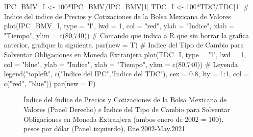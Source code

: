 \documentclass[
  a4paper,
]{article}
\newenvironment{Shaded}{}{}
\newcommand{\AttributeTok}[1]{\textcolor[rgb]{0.84,0.23,0.29}{#1}}
\newcommand{\CommentTok}[1]{\textcolor[rgb]{0.42,0.45,0.49}{#1}}
\newcommand{\DecValTok}[1]{\textcolor[rgb]{0.00,0.36,0.77}{#1}}
\newcommand{\FloatTok}[1]{\textcolor[rgb]{0.00,0.36,0.77}{#1}}
\newcommand{\FunctionTok}[1]{\textcolor[rgb]{0.44,0.26,0.76}{#1}}
\newcommand{\NormalTok}[1]{\textcolor[rgb]{0.14,0.16,0.18}{#1}}
\newcommand{\OtherTok}[1]{\textcolor[rgb]{0.44,0.26,0.76}{#1}}
\newcommand{\SpecialCharTok}[1]{\textcolor[rgb]{0.00,0.36,0.77}{#1}}
\newcommand{\StringTok}[1]{\textcolor[rgb]{0.01,0.18,0.38}{#1}}
\begin{document}
\begin{Shaded}
\begin{Highlighting}[]
\NormalTok{IPC\_BMV\_I }\OtherTok{\textless{}{-}} \DecValTok{100}\SpecialCharTok{*}\NormalTok{IPC\_BMV}\SpecialCharTok{/}\NormalTok{IPC\_BMV[}\DecValTok{1}\NormalTok{]}
\NormalTok{TDC\_I }\OtherTok{\textless{}{-}} \DecValTok{100}\SpecialCharTok{*}\NormalTok{TDC}\SpecialCharTok{/}\NormalTok{TDC[}\DecValTok{1}\NormalTok{]}
\CommentTok{\# Indice del indice de Precios y Cotizaciones de la Bolsa Mexicana de Valores}
\FunctionTok{plot}\NormalTok{(IPC\_BMV\_I, }\AttributeTok{type =} \StringTok{"l"}\NormalTok{, }\AttributeTok{lwd =} \DecValTok{1}\NormalTok{, }\AttributeTok{col =} \StringTok{"red"}\NormalTok{, }\AttributeTok{ylab =} \StringTok{"Indice"}\NormalTok{, }\AttributeTok{xlab =} \StringTok{"Tiempo"}\NormalTok{, }\AttributeTok{ylim =} \FunctionTok{c}\NormalTok{(}\DecValTok{80}\NormalTok{,}\DecValTok{740}\NormalTok{))}
\CommentTok{\# Comando que indica a R que sin borrar la grafica anterior, grafique la siguiente.}
\FunctionTok{par}\NormalTok{(}\AttributeTok{new =}\NormalTok{ T)}
\CommentTok{\# Indice del Tipo de Cambio para Solventar Obligaciones en Moneda Extranjera}
\FunctionTok{plot}\NormalTok{(TDC\_I, }\AttributeTok{type =} \StringTok{"l"}\NormalTok{, }\AttributeTok{lwd =} \DecValTok{1}\NormalTok{, }\AttributeTok{col =} \StringTok{"blue"}\NormalTok{, }\AttributeTok{ylab =} \StringTok{"Indice"}\NormalTok{, }\AttributeTok{xlab =} \StringTok{"Tiempo"}\NormalTok{, }\AttributeTok{ylim =} \FunctionTok{c}\NormalTok{(}\DecValTok{80}\NormalTok{,}\DecValTok{740}\NormalTok{))}
\CommentTok{\# Leyenda}
\FunctionTok{legend}\NormalTok{(}\StringTok{"topleft"}\NormalTok{, }\FunctionTok{c}\NormalTok{(}\StringTok{"Indice del IPC"}\NormalTok{,}\StringTok{"Indice del TDC"}\NormalTok{), }\AttributeTok{cex =} \FloatTok{0.8}\NormalTok{, }\AttributeTok{lty =} \DecValTok{1}\SpecialCharTok{:}\DecValTok{1}\NormalTok{, }\AttributeTok{col =} \FunctionTok{c}\NormalTok{(}\StringTok{"red"}\NormalTok{, }\StringTok{"blue"}\NormalTok{))}
\FunctionTok{par}\NormalTok{(}\AttributeTok{new =}\NormalTok{ F)}
\end{Highlighting}
\end{Shaded}

\begin{figure}[H]

\caption{\label{fig-fig4}Índice del índice de Precios y Cotizaciones de
la Bolsa Mexicana de Valores (Panel Derecho) e Índice del Tipo de Cambio
para Solventar Obligaciones en Moneda Extranjera (ambos enero de 2002 =
100), pesos por dólar (Panel izquierdo), Ene.2002-May.2021}


\end{figure}%
\end{document}
